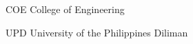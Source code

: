 
\begin{Nomencl}[3cm]
	\item[COE] 		College of Engineering
	\item[UPD] 		University of the Philippines Diliman
\end{Nomencl}
\clearpage
